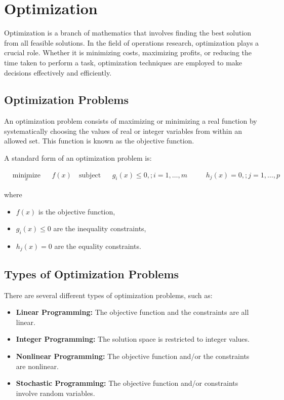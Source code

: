 \chapter{Optimization}

Optimization is a branch of mathematics that involves finding the best
solution from all feasible solutions. In the field of operations
research, optimization plays a crucial role. Whether it is minimizing
costs, maximizing profits, or reducing the time taken to perform a
task, optimization techniques are employed to make decisions
effectively and efficiently.

\section{Optimization Problems}

An optimization problem consists of maximizing or minimizing a real
function by systematically choosing the values of real or integer
variables from within an allowed set. This function is known as the
objective function.

A standard form of an optimization problem is:

\begin{equation*}
\begin{aligned}
& \underset{x}{\text{minimize}}
& & f(x) \
& \text{subject to}
& & g_i(x) \leq 0, ; i = 1, \ldots, m \
&
& & h_j(x) = 0, ; j = 1, \ldots, p
\end{aligned}
\end{equation*}

where
\begin{itemize}
\item $f(x)$ is the objective function,
\item $g_i(x) \leq 0$ are the inequality constraints,
\item $h_j(x) = 0$ are the equality constraints.
\end{itemize}

\section{Types of Optimization Problems}
There are several different types of optimization problems, such as:

\begin{itemize}
\item \textbf{Linear Programming:} The objective function and the constraints are all linear.
\item \textbf{Integer Programming:} The solution space is restricted to integer values.
\item \textbf{Nonlinear Programming:} The objective function and/or the constraints are nonlinear.
\item \textbf{Stochastic Programming:} The objective function and/or constraints involve random variables.
\end{itemize}

